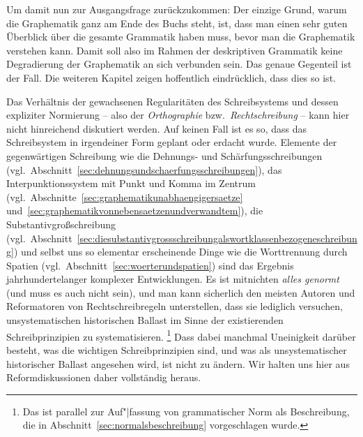 Um damit nun zur Ausgangsfrage zurückzukommen:
Der einzige Grund, warum die Graphematik ganz am Ende des Buchs steht, ist, dass man einen sehr guten Überblick über die gesamte Grammatik haben muss, bevor man die Graphematik verstehen kann.
Damit soll also im Rahmen der deskriptiven Grammatik keine Degradierung der Graphematik an sich verbunden sein.
Das genaue Gegenteil ist der Fall.
Die weiteren Kapitel zeigen hoffentlich eindrücklich, dass dies so ist.

Das Verhältnis der gewachsenen Regularitäten des Schreibsystems und dessen expliziter Normierung -- also der \textit{Orthographie} bzw.\ \textit{Rechtschreibung} -- kann hier nicht hinreichend diskutiert werden.
Auf keinen Fall ist es so, dass das Schreibsystem in irgendeiner Form geplant oder erdacht wurde.
Elemente der gegenwärtigen Schreibung wie die Dehnungs- und Schärfungsschreibungen (vgl.\ Abschnitt~\ref{sec:dehnungsundschaerfungsschreibungen}), das Interpunktionssystem mit Punkt und Komma im Zentrum (vgl.\ Abschnitte~\ref{sec:graphematikunabhaengigersaetze} und~\ref{sec:graphematikvonnebensaetzenundverwandtem}), die Substantivgroßschreibung (vgl.\ Abschnitt~\ref{sec:diesubstantivgrossschreibungalswortklassenbezogeneschreibung}) und selbst uns so elementar erscheinende Dinge wie die Worttrennung durch Spatien (vgl.\ Abschnitt~\ref{sec:woerterundspatien}) sind das Ergebnis jahrhundertelanger komplexer Entwicklungen.
Es ist mitnichten \textit{alles genormt} (und muss es auch nicht sein), und man kann sicherlich den meisten Autoren und Reformatoren von Rechtschreibregeln unterstellen, dass sie lediglich versuchen, unsystematischen historischen Ballast im Sinne der existierenden Schreibprinzipien zu systematisieren.%
\footnote{Das ist parallel zur Auf"|fassung von grammatischer Norm als Beschreibung, die in Abschnitt~\ref{sec:normalsbeschreibung} vorgeschlagen wurde.}
Dass dabei manchmal Uneinigkeit darüber besteht, was die wichtigen Schreibprinzipien sind, und was als unsystematischer historischer Ballast angesehen wird, ist nicht zu ändern.
Wir halten uns hier aus Reformdiskussionen daher vollständig heraus.

